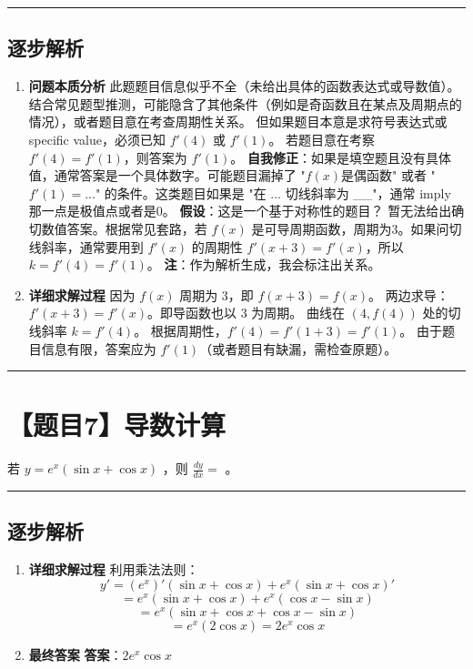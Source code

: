 \documentclass[UTF8]{ctexart}
\newenvironment{redenv}{\color{red}}{}
\newenvironment{detailedanalysis}{%
    \color{red}
    \begin{enumerate}[label=\textbf{第\arabic*步：}, leftmargin=*, align=left, itemsep=1.5ex]
}{%
    \end{enumerate}
}
\newcommand{\problemrule}{\noindent\rule{\textwidth}{1.5pt}\vspace{-0.8em}}
\newcommand{\analysisrule}{\noindent\rule{\textwidth}{0.8pt}\vspace{-0.8em}}
\newcommand{\blank}[1]{\underline{\hspace{#1}}}
\begin{document}
\begin{redenv}
\analysisrule
\subsection*{逐步解析}

\begin{detailedanalysis}
\item \textbf{问题本质分析}
此题题目信息似乎不全（未给出具体的函数表达式或导数值）。结合常见题型推测，可能隐含了其他条件（例如是奇函数且在某点及周期点的情况），或者题目意在考查周期性关系。
但如果题目本意是求符号表达式或 specific value，必须已知 $f'(4)$ 或 $f'(1)$。
若题目意在考察 $f'(4) = f'(1)$，则答案为 $f'(1)$。
\textbf{自我修正}：如果是填空题且没有具体值，通常答案是一个具体数字。可能题目漏掉了 "$f(x)$是偶函数" 或者 "$f'(1)=...$" 的条件。这类题目如果是 "在 ... 切线斜率为 \_\_"，通常 imply 那一点是极值点或者是0。
\textbf{假设}：这是一个基于对称性的题目？
暂无法给出确切数值答案。根据常见套路，若 $f(x)$ 是可导周期函数，周期为3。如果问切线斜率，通常要用到 $f'(x)$ 的周期性 $f'(x+3) = f'(x)$，所以 $k = f'(4) = f'(1)$。
\textbf{注}：作为解析生成，我会标注出关系。

\item \textbf{详细求解过程}
因为 $f(x)$ 周期为 3，即 $f(x+3) = f(x)$。
两边求导：$f'(x+3) = f'(x)$。即导函数也以 3 为周期。
曲线在 $(4, f(4))$ 处的切线斜率 $k = f'(4)$。
根据周期性，$f'(4) = f'(1 + 3) = f'(1)$。
由于题目信息有限，答案应为 $f'(1)$（或者题目有缺漏，需检查原题）。
\end{detailedanalysis}
\end{redenv}

\problemrule
\section*{【题目7】导数计算}
若 $ y = e^{x}(\sin x + \cos x) $ ，则 $ \frac{dy}{dx} = $ \blank{2cm}。

\begin{redenv}
\analysisrule
\subsection*{逐步解析}

\begin{detailedanalysis}
\item \textbf{详细求解过程}
利用乘法法则：
$$ y' = (e^x)'(\sin x + \cos x) + e^x (\sin x + \cos x)' $$
$$ = e^x(\sin x + \cos x) + e^x (\cos x - \sin x) $$
$$ = e^x (\sin x + \cos x + \cos x - \sin x) $$
$$ = e^x (2\cos x) = 2e^x \cos x $$

\item \textbf{最终答案}
\textbf{答案}：$ 2e^x \cos x $
\end{detailedanalysis}
\end{redenv}
\end{document}
